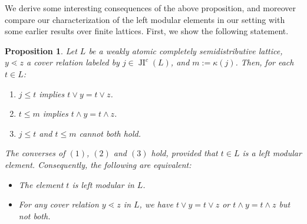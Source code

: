 \documentclass{amsart}
\theoremstyle{thmstyle}
\newtheorem{proposition}[thm]{Proposition}
\theoremstyle{exstyle}
\theoremstyle{defstyle}
\theoremstyle{remstyle}
\theoremstyle{remstyle}
\DeclareMathOperator*{\JI}{JI}
\begin{document}
We derive some interesting consequences of the above proposition, and moreover compare our characterization of the left modular elements in our setting with some earlier results over finite lattices. First, we show the following statement.

\begin{proposition}\label{Prop: left modular and cover-relation equivalences}
Let $L$ be a weakly atomic completely semidistributive lattice, $y \lessdot z$ a cover relation labeled by $j \in \JI^c(L)$, and 
$m := \kappa(j)$. 
Then, for each $t \in L$:
\begin{enumerate}
    \item $j \leq t$ implies $t \vee y = t \vee z$.
    \item $t \leq m$ implies $t \wedge y = t \wedge z$.
    \item $j \leq t$ and $t \leq m$ cannot both hold.
\end{enumerate}
The converses of $(1)$, $(2)$ and $(3)$ hold, provided that $t\in L$ is a left modular element.
Consequently, the following are equivalent:

\begin{itemize}
    \item [(i)] The element $t$ is left modular in $L$.
    \item [(ii)] For any cover relation $y\lessdot z$ in $L$, we have $t \vee y = t \vee z$ or $t \wedge y = t \wedge z$ but not both.
\end{itemize}
\end{proposition}
\end{document}
